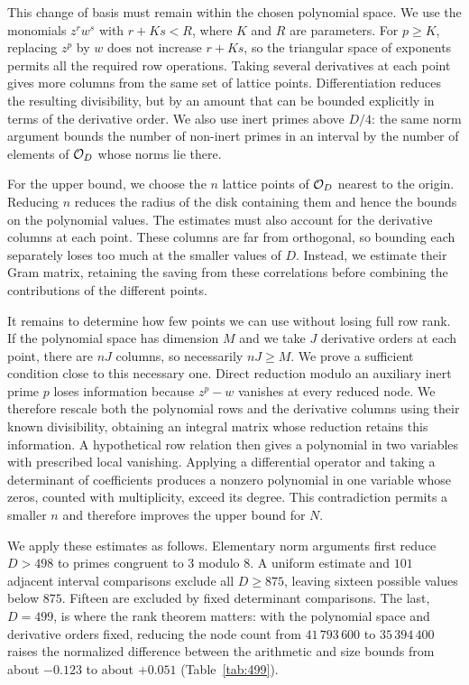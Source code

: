 This change of basis must remain within the chosen polynomial space. We use
the monomials $z^rw^s$ with $r+Ks<R$, where $K$ and $R$ are parameters. For
$p\geq K$, replacing $z^p$ by $w$ does not increase $r+Ks$, so the triangular
space of exponents permits all the required row operations. Taking several derivatives at each point gives more columns from the same
set of lattice points. Differentiation reduces the resulting divisibility,
but by an amount that can be bounded explicitly in terms of the derivative
order. We also use inert primes above
$D/4$: the same norm argument bounds the number of non-inert primes in an
interval by the number of elements of $\mathcal O_D$ whose norms lie there.

For the upper bound, we choose the $n$ lattice points of $\mathcal O_D$ nearest to
the origin. Reducing $n$ reduces the radius of the disk containing them and
hence the bounds on the polynomial values. The estimates must also account
for the derivative columns at each point. These columns are far from
orthogonal, so bounding each separately loses too much at the smaller
values of $D$. Instead, we estimate their Gram matrix, retaining the saving
from these correlations before combining the contributions of the
different points.

It remains to determine how few points we can use without losing full row
rank. If the polynomial space has dimension $M$ and we take $J$ derivative
orders at each point, there are $nJ$ columns, so necessarily $nJ\geq M$.
We prove a sufficient condition close to this necessary one. Direct
reduction modulo an auxiliary inert prime $p$ loses information because
$z^p-w$ vanishes at every reduced node. We therefore rescale both the
polynomial rows and the derivative columns using their known divisibility,
obtaining an integral matrix whose reduction retains this information.
A hypothetical row relation then gives a polynomial in two variables with
prescribed local vanishing. Applying a differential operator and taking a
determinant of coefficients produces a nonzero polynomial in one variable
whose zeros, counted with multiplicity, exceed its degree. This contradiction
permits a smaller $n$ and therefore improves the upper bound for $N$.

We apply these estimates as follows. Elementary norm arguments first reduce
$D>498$ to primes congruent to $3$ modulo $8$. A uniform estimate and $101$
adjacent interval comparisons exclude all $D\geq875$, leaving sixteen
possible values below $875$. Fifteen are excluded by fixed determinant
comparisons. The last, $D=499$, is where the rank theorem matters: with the
polynomial space and derivative orders fixed, reducing the node count from
$41\,793\,600$ to $35\,394\,400$ raises the normalized difference between
the arithmetic and size bounds from about $-0.123$ to about $+0.051$
(Table~\ref{tab:499}).

